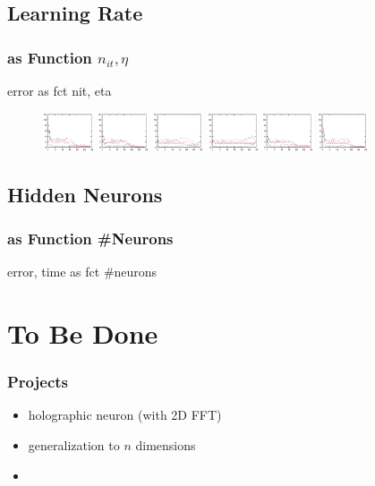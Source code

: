 \documentclass{beamer}
\begin{document}
\subsection{Learning Rate}
\begin{frame}
\frametitle{as Function $n_{it},\eta$}
error as fct nit, eta
	\begin{figure}
		\centering
		\includegraphics[width=1.5cm]{fig/err/e1.eps}
		\includegraphics[width=1.5cm]{fig/err/e2.eps}
		\includegraphics[width=1.5cm]{fig/err/e3.eps}
		\hspacs
		\includegraphics[width=1.5cm]{fig/err/e4.eps}
		\includegraphics[width=1.5cm]{fig/err/e5.eps}
		\includegraphics[width=1.5cm]{fig/err/e6.eps}
	\end{figure}
\end{frame}

\subsection{Hidden Neurons}
\begin{frame}
\frametitle{as Function \#Neurons}
error, time as fct \#neurons
\end{frame}

\section{To Be Done}
\begin{frame}
\frametitle{Projects}
\begin{itemize}
  \item holographic neuron (with 2D FFT)
  \item generalization to $n$ dimensions
  \item 
\end{itemize}

\end{frame}
\end{document}
